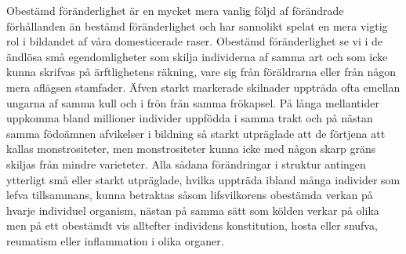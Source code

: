 Obestämd föränderlighet är en mycket mera vanlig följd af förändrade förhållanden än bestämd föränderlighet och har sannolikt spelat en mera vigtig rol i bildandet af våra domesticerade raser. Obestämd föränderlighet se vi i de ändlösa små egendomligheter som skilja individerna af samma art och som icke kunna skrifvas på ärftlighetens räkning, vare sig från föräldrarna eller från någon mera aflägsen stamfader. Äfven starkt markerade skilnader uppträda ofta emellan ungarna af samma kull och i frön från samma frökapsel. På långa mellantider uppkomma bland millioner individer uppfödda i samma trakt och på nästan samma födoämnen afvikelser i bildning så starkt utpräglade att de förtjena att kallas monstrositeter, men monstrositeter kunna icke med någon skarp gräns skiljas från mindre varieteter. Alla sådana förändringar i struktur antingen ytterligt små eller starkt utpräglade, hvilka uppträda ibland många individer som lefva tillsammans, kunna betraktas såsom lifsvilkorens obestämda verkan på hvarje individuel organism, nästan på samma sätt som kölden verkar på olika men på ett obestämdt vis alltefter individens konstitution, hosta eller snufva, reumatism eller inflammation i olika organer.


